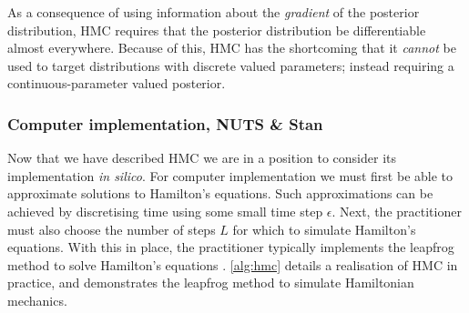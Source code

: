 As a consequence of using information about the \emph{gradient} of the
posterior distribution, HMC requires that the posterior distribution be
differentiable almost everywhere. Because of this, HMC has the shortcoming
that it \emph{cannot} be used to target distributions with discrete valued
parameters; instead requiring a continuous-parameter valued posterior.

\subsubsection{Computer implementation, NUTS \& Stan}

Now that we have described HMC we are in a position to consider its
implementation \emph{in silico}. For computer implementation we must first be
able to approximate solutions to Hamilton's equations. Such approximations can
be achieved by discretising time using some small time step $\epsilon$. Next,
the practitioner must also choose the number of steps $L$ for which to simulate
Hamilton's equations. With this in place, the practitioner typically implements
the leapfrog method to solve Hamilton's equations \parencite{neal11}.
\cref{alg:hmc} details a realisation of HMC in practice, and demonstrates the
leapfrog method to simulate Hamiltonian mechanics.

